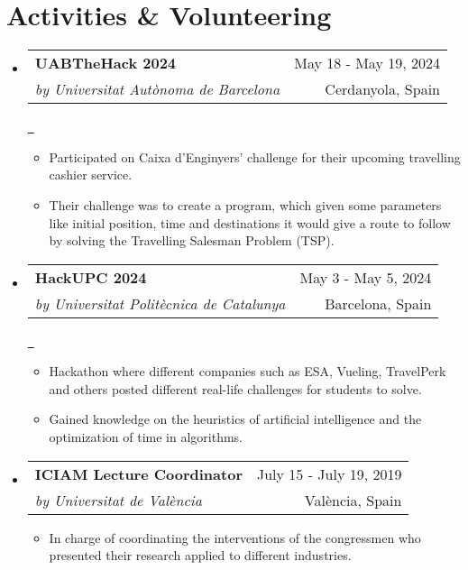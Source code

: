 \documentclass[a4paper,11pt,dvipsnames]{article}
\makeatletter
\newcommand{\espai}{\symbol{32}\symbol{32}\symbol{32}\symbol{32}\symbol{32}\symbol{32}\symbol{32}\symbol{32}\symbol{32}\symbol{32}\symbol{32}\symbol{32}\symbol{32}\symbol{32}\symbol{32}\symbol{32}\symbol{32}\symbol{32}\symbol{32}\symbol{32}\symbol{32}\symbol{32}\symbol{32}\symbol{32}\symbol{32}\symbol{32}\symbol{32}\symbol{32}\symbol{32}\symbol{32}\symbol{32}\symbol{32}\symbol{32}\symbol{32}\symbol{32}\symbol{32}\symbol{32}\symbol{32}\symbol{32}\symbol{32}\symbol{32}\symbol{32}\symbol{32}\symbol{32}\symbol{32}\symbol{32}\symbol{32}\symbol{32}\symbol{32}\symbol{32}\symbol{32}\symbol{32}\symbol{32}\symbol{32}\symbol{32}\symbol{32}\symbol{32}\symbol{32}\symbol{32}\symbol{32}\symbol{32}\symbol{32}\symbol{32}\symbol{32}\symbol{32}\symbol{32}\symbol{32}\symbol{32}\symbol{32}\symbol{32}\symbol{32}\symbol{32}\symbol{32}\symbol{32}\symbol{32}\symbol{32}\symbol{32}\symbol{32}\symbol{32}\symbol{32}\symbol{32}\symbol{32}\symbol{32}\symbol{32}\symbol{32}\symbol{32}\symbol{32}\symbol{32}\symbol{32}\symbol{32}\symbol{32}\symbol{32}\symbol{32}\symbol{32}\symbol{32}\symbol{32}\symbol{32}\symbol{32}\symbol{32}\symbol{32}\symbol{32}\symbol{32}\symbol{32}\symbol{32}\symbol{32}\symbol{32}\symbol{32}\symbol{32}\symbol{32}\symbol{32}\symbol{32}\symbol{32}\symbol{32}\symbol{32}\symbol{32}\symbol{32}\symbol{32}\symbol{32}\symbol{32}\symbol{32}\symbol{32}\symbol{32}\symbol{32}\symbol{32}\symbol{32}\symbol{32}\symbol{32}\symbol{32}\symbol{32}\symbol{32}\symbol{32}\symbol{32}\symbol{32}\symbol{32}\symbol{32}\symbol{32}\symbol{32}\symbol{32}\symbol{32}\symbol{32}\symbol{32}\symbol{32}\symbol{32}\symbol{32}\symbol{32}\symbol{32}\symbol{32}\symbol{32}\symbol{32}\symbol{32}\symbol{32}\symbol{32}\symbol{32}\symbol{32}\symbol{32}\symbol{32}\symbol{32}\symbol{32}\symbol{32}\symbol{32}\symbol{32}\symbol{32}\symbol{32}\symbol{32}\symbol{32}\symbol{32}\symbol{32}\symbol{32}\symbol{32}\symbol{32}\symbol{32}\symbol{32}\symbol{32}\symbol{32}\symbol{32}\symbol{32}\symbol{32}\symbol{32}\symbol{32}\symbol{32}\symbol{32}}
\newcommand{\resumeQuadHeading}[4]{
	\item
	\begin{tabular*}{0.96\textwidth}[t]{l@{\extracolsep{\fill}}r}
		\textbf{#1} & \small #2 \\
		\small#3 & \small #4 \\
	\end{tabular*}
}
\newcommand{\resumeHeadingListStart}{
	\begin{itemize}[leftmargin=0.15in, label={}]
	}
\newcommand{\resumeHeadingListEnd}{\end{itemize}}
\makeatother
\begin{document}
	\section{Activities \& Volunteering}
	\resumeHeadingListStart{}
	\resumeQuadHeading{UABTheHack 2024 \tcbox{\color{white}\textbf{Python}}\hspace*{1mm} \tcbox{\color{white}\textbf{Problem-solving}}\hspace*{1mm} \tcbox{\color{white}\textbf{Git}}}{May 18 - May 19, 2024}{\textit{by Universitat Autònoma de Barcelona}}{Cerdanyola, Spain}{\espai}{\href{https://github.com/Tutusaus/UABTheHack}{\faGithub \ }}
	\begin{itemize}[leftmargin=3em, itemsep=0.1em, topsep=2pt]
		\item \small Participated on Caixa d'Enginyers' challenge for their upcoming travelling cashier service.
		\item \small Their challenge was to create a program, which given some parameters like initial position, time and destinations it would give a route to follow by solving the Travelling Salesman Problem (TSP).
	\end{itemize}
	\resumeHeadingListEnd{}
	
	\resumeHeadingListStart{}
	\resumeQuadHeading{HackUPC 2024 \tcbox{\color{white}\textbf{C++}}\hspace*{1mm}\tcbox{\color{white}\textbf{AI}}\hspace*{1mm}\tcbox{\color{white}\textbf{Programming}}}{May 3 - May 5, 2024}{\textit{by Universitat Politècnica de Catalunya}}{Barcelona, Spain}{\espai}{\href{https://github.com/Tutusaus/HackUPC2024}{\faGithub \ }}
	\begin{itemize}[leftmargin=3em, itemsep=0.1em, topsep=2pt]
		\item \small Hackathon where different companies such as ESA, Vueling, TravelPerk and others posted different real-life challenges for students to solve.
		\item \small Gained knowledge on the heuristics of artificial intelligence and the optimization of time in algorithms.
	\end{itemize}
	\resumeHeadingListEnd{}
	
	\resumeHeadingListStart{}
	\resumeQuadHeading{ICIAM Lecture Coordinator }{July 15 - July 19, 2019}{\textit{by Universitat de València}}{València, Spain}
	\begin{itemize}[leftmargin=3em, itemsep=0.1em, topsep=2pt]
		\item \small In charge of coordinating the interventions of the congressmen who presented their research applied to different industries.
	\end{itemize}
	\resumeHeadingListEnd{}
	
\end{document}
